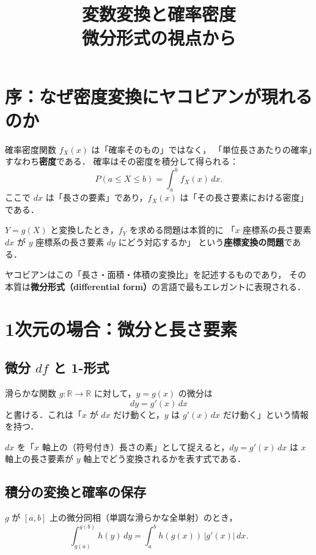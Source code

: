 \documentclass[lualatex,ja=standard,a4paper,12pt]{bxjsarticle}
\title{\textbf{変数変換と確率密度} \\[6pt]
       {\large 微分形式の視点から}}
\author{}
\date{}
\begin{document}
\maketitle
\thispagestyle{empty}
\tableofcontents
\newpage

\section{序：なぜ密度変換にヤコビアンが現れるのか}

確率密度関数 $f_X(x)$ は「確率そのもの」ではなく，
「単位長さあたりの確率」すなわち\textbf{密度}である．
確率はその密度を積分して得られる：
\[
  P(a \leq X \leq b) = \int_a^b f_X(x)\,dx.
\]
ここで $dx$ は「長さの要素」であり，$f_X(x)$ は「その長さ要素における密度」である．

$Y = g(X)$ と変換したとき，$f_Y$ を求める問題は本質的に
「$x$ 座標系の長さ要素 $dx$ が $y$ 座標系の長さ要素 $dy$ にどう対応するか」
という\textbf{座標変換の問題}である．

ヤコビアンはこの「長さ・面積・体積の変換比」を記述するものであり，
その本質は\textbf{微分形式（differential form）}の言語で最もエレガントに表現される．

\section{1次元の場合：微分と長さ要素}

\subsection{微分 $df$ と 1-形式}

滑らかな関数 $g: \mathbb{R} \to \mathbb{R}$ に対して，$y = g(x)$ の微分は
\[
  dy = g'(x)\,dx
\]
と書ける．これは「$x$ が $dx$ だけ動くと，$y$ は $g'(x)\,dx$ だけ動く」という情報を持つ．

$dx$ を「$x$ 軸上の（符号付き）長さの素」として捉えると，$dy = g'(x)\,dx$ は
$x$ 軸上の長さ要素が $y$ 軸上でどう変換されるかを表す式である．

\subsection{積分の変換と確率の保存}

$g$ が $[a,b]$ 上の微分同相（単調な滑らかな全単射）のとき，
\[
  \int_{g(a)}^{g(b)} h(y)\,dy = \int_a^b h(g(x))\,|g'(x)|\,dx.
\]
\end{document}
